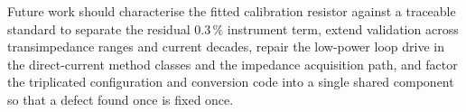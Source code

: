 Future work should characterise the fitted calibration resistor against a
traceable standard to separate the residual $0.3\,\%$ instrument term, extend
validation across transimpedance ranges and current decades, repair the
low-power loop drive in the direct-current method classes and the impedance
acquisition path, and factor the triplicated configuration and conversion code
into a single shared component so that a defect found once is fixed once.
